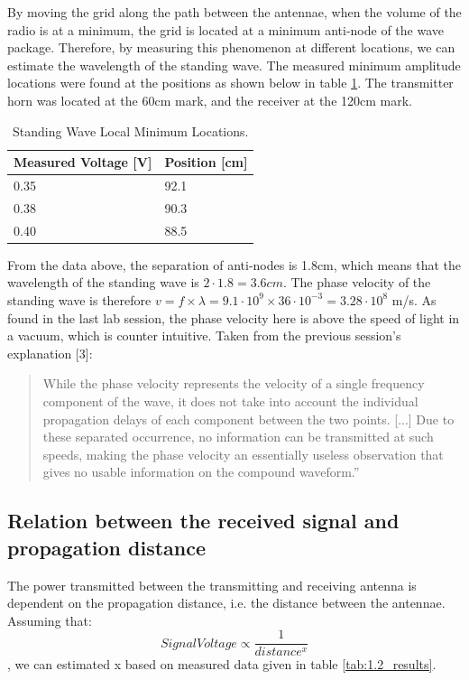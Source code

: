 \documentclass[11pt,a4paper]{article}
\begin{document}
By moving the grid along the path between the antennae, when the volume of the radio is at a minimum, the grid is located at a minimum anti-node of the wave package. Therefore, by measuring this phenomenon at different locations, we can estimate the wavelength of the standing wave. The measured minimum amplitude locations were found at the positions as shown below in table \ref{tab:1.1_results}. The transmitter horn was located at the 60cm mark, and the receiver at the 120cm mark.\\

\begin{table}[H]
\centering
\caption{Standing Wave Local Minimum Locations.}
\label{tab:1.1_results}
\begin{tabular}{| l | l |}
  \hline
  \textbf{Measured Voltage [V]} & \textbf{Position [cm]} \\ \hline
  0.35 & 92.1 \\ \hline
  0.38 & 90.3 \\ \hline
  0.40 & 88.5 \\ \hline
\end{tabular}
\end{table}

From the data above, the separation of anti-nodes is 1.8cm, which means that the wavelength of the standing wave is $2 \cdot 1.8 = 3.6cm$. The phase velocity of the standing wave is therefore $v = f \times \lambda = 9.1 \cdot 10^9 \times 36 \cdot 10^{-3} = 3.28 \cdot 10^8$ m/s. As found in the last lab session, the phase velocity here is above the speed of light in a vacuum, which is counter intuitive. Taken from the previous session's explanation [3]:
\begin{quotation}
While the phase velocity represents the velocity of a single frequency component of the wave, it does not take into account the individual propagation delays of each component between the two points. [...] Due to these separated occurrence, no information can be transmitted at such speeds, making the phase velocity an essentially useless observation that gives no usable information on the compound waveform.''
\end{quotation}

\subsection{Relation between the received signal and propagation distance}
The power transmitted between the transmitting and receiving antenna is dependent on the propagation distance, i.e. the distance between the antennae. Assuming that:
\begin{equation}
Signal Voltage \propto \frac{1}{distance^{x}}
\end{equation}, 
we can estimated x based on measured data given in table \ref{tab:1.2_results}.
\end{document}
